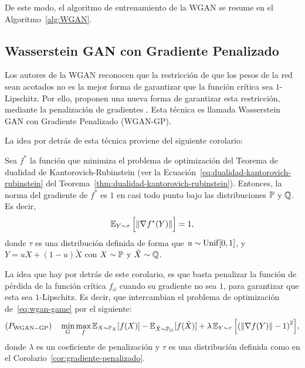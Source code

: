 De este modo, el algoritmo de entrenamiento de la WGAN se resume en el Algoritmo~\ref{alg:WGAN}.


\subsection{Wasserstein GAN con Gradiente Penalizado}\label{ssec:}  %
Los autores de la WGAN reconocen que la restricción de que los pesos de la red sean acotados no es la mejor forma de garantizar que la función crítica sea $1$-Lipschitz. Por ello, proponen una nueva forma de garantizar esta restricción, mediante la penalización de gradientes \cite{gulrajani2017improved}. Esta técnica es llamada Wasserstein GAN con Gradiente Penalizado (WGAN-GP).

La idea por detrás de esta técnica proviene del siguiente corolario:

\begin{corollary}\label{cor:gradiente-penalizado}
	Sea $f^\ast$ la función que minimiza el problema de optimización del Teorema de dualidad de Kantorovich-Rubinstein (ver la Ecuación~\eqref{eq:dualidad-kantorovich-rubinstein} del Teorema~\ref{thm:dualidad-kantorovich-rubinstein}). Entonces, la norma del gradiente de $f^\ast$ es $1$ en casi todo punto bajo las distribuciones $\Prob$ y $\ProbQ$. Es decir,
	\begin{equation}
		\Exp_{Y\sim\tau} \qty\Big[ \norm{\nabla f^\ast(Y)} ] = 1,
	\end{equation}
	donde $\tau$ es una distribución definida de forma que $u\sim\mathrm{Unif}[0, 1]$, y $Y = uX + (1-u)\tilde X$ con $X\sim\Prob$ y $\tilde X\sim\ProbQ$.
\end{corollary}

La idea que hay por detrás de este corolario, es que basta penalizar la función de pérdida de la función crítica $f_\omega$ cuando su gradiente no sea $1$, para garantizar que esta sea $1$-Lipschitz. Es decir, que intercambian el problema de optimización de~\eqref{eq:wgan-game} por el siguiente:
\begin{equation}
	(P_{\mathrm{WGAN-GP}}) \quad \min_{G} \max_{f} \Exp_{X\sim \Prob_X} [f(X)] - \Exp_{\tilde X \sim \Prob_G} [f(\tilde X)] + \lambda \Exp_{Y\sim\tau} \qty\Big[ \qty(\norm{\nabla f(Y)} - 1)^2 ],
\end{equation}
donde $\lambda$ es un coeficiente de penalización y $\tau$ es una distribución definida como en el Corolario~\ref{cor:gradiente-penalizado}.

